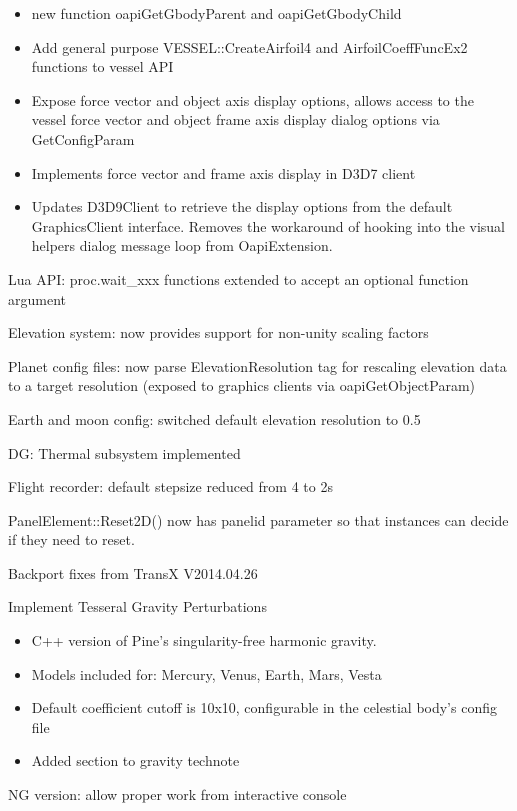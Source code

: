 \documentclass[Orbiter User Manual.tex]{subfiles}
\begin{document}
\begin{itemize}
\begin{sloppypar}
\begin{itemize}
		\item new function oapiGetGbodyParent and oapiGetGbodyChild
		\item Add general purpose VESSEL::CreateAirfoil4 and AirfoilCoeffFuncEx2 functions to vessel API
		\item Expose force vector and object axis display options, allows access to the vessel force vector and object frame axis display dialog options via GetConfigParam
		\item Implements force vector and frame axis display in D3D7 client
		\item Updates D3D9Client to retrieve the display options from the default GraphicsClient interface. Removes the workaround of hooking into the visual helpers dialog message loop from OapiExtension.
	\end{itemize}
	\item Lua API: proc.wait\_xxx functions extended to accept an optional function argument
	\item Elevation system: now provides support for non-unity scaling factors
	\item Planet config files: now parse ElevationResolution tag for rescaling elevation data to a target resolution (exposed to graphics clients via oapiGetObjectParam)
	\item Earth and moon config: switched default elevation resolution to 0.5
	\item DG: Thermal subsystem implemented
	\item Flight recorder: default stepsize reduced from 4 to 2s
	\item PanelElement::Reset2D() now has panelid parameter so that instances can decide if they need to reset.
	\item Backport fixes from TransX V2014.04.26
	\item Implement Tesseral Gravity Perturbations
	\begin{itemize}
		\item C++ version of Pine's singularity-free harmonic gravity.
		\item Models included for: Mercury, Venus, Earth, Mars, Vesta
		\item Default coefficient cutoff is 10x10, configurable in the celestial body's config file
		\item Added section to gravity technote
	\end{itemize}
	\item NG version: allow proper work from interactive console
	\begin{itemize}

\end{itemize}
\end{sloppypar}
\end{itemize}
\end{document}
